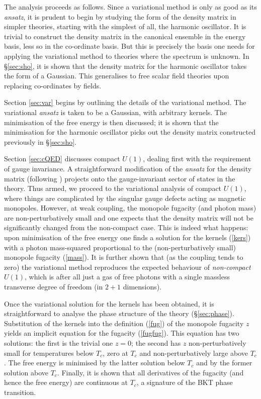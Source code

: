 \documentclass[a4paper,a4paper]{article}
\begin{document}
The analysis proceeds as follows. Since a variational method is only as good as its \emph{ansatz},
it is prudent to begin by studying the form of the density matrix in simpler theories, 
starting with the simplest of all, the harmonic oscillator. It is trivial to construct the density matrix in the
canonical ensemble in the energy basis, less so in the co-ordinate basis. 
But this is precisely the basis one needs for applying the variational method to theories where the spectrum is unknown. 
In \S\ref{sec:sho}, it is shown that the density matrix for the harmonic oscillator takes the form of a Gaussian.
This generalises to free scalar field theories upon replacing co-ordinates by fields.

Section \ref{sec:var} begins by outlining the details of the variational method. 
The variational \emph{ansatz} is taken to be a Gaussian, with arbitrary kernels. 
The minimisation of the free energy is then discussed; it is shown that the minimisation for the harmonic oscillator
picks out the density matrix constructed previously in \S\ref{sec:sho}. 

Section \ref{sec:cQED} discusses compact $U(1)$, dealing first
with the requirement of gauge invariance.
A straightforward modification of the \emph{ansatz} for the density matrix (following \cite{Kogan:2002yr}) projects
onto the gauge-invariant sector of states in the theory. 
Thus armed, we proceed to the variational analysis of compact $U(1)$, where things are complicated by the singular gauge defects
acting as magnetic monopoles. However, at weak coupling, the monopole fugacity (and photon mass)
are non-perturbatively small and one expects
that the density matrix will not be significantly changed from the non-compact case. This is indeed what happens: upon minimisation
of the free energy one finds a solution for the kernels (\ref{kers}) with a photon mass-squared
proportional to the (non-perturbatively small) monopole fugacity (\ref{mass}). 
It is further shown that (as the coupling tends to zero) the
variational method reproduces the expected behaviour of 
\emph{non-compact} $U(1)$, which is after all
just a gas of free photons with a single massless transverse degree of freedom (in $2+1$ dimensions).

Once the variational solution for the kernels has been obtained, 
it is straightforward to analyse the phase structure of the theory (\S\ref{sec:phase}).
Substitution of the kernels into the definition (\ref{fug}) of the monopole fugacity $z$ yields an implicit equation for
the fugacity (\ref{fugfug}). This equation has two solutions: the first is the trivial one $z=0$; 
the second has $z$ non-perturbatively small for temperatures below $T_c$, zero at $T_c$ and non-perturbatively large above $T_c$.
The free energy is minimised by the latter solution below $T_c$ and by the former solution above $T_c$. Finally, it is
shown that all derivatives of the fugacity (and hence the free energy) are continuous at $T_c$, a signature of the BKT phase transition.
\end{document}
